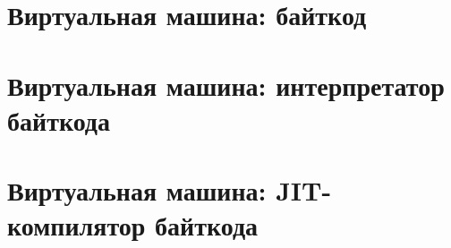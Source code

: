 \documentclass[11pt]{book}
\begin{document}
\section{Виртуальная машина: байткод}


\section{Виртуальная машина: интерпретатор байткода}


\section{Виртуальная машина: JIT-компилятор байткода}


\end{document}
